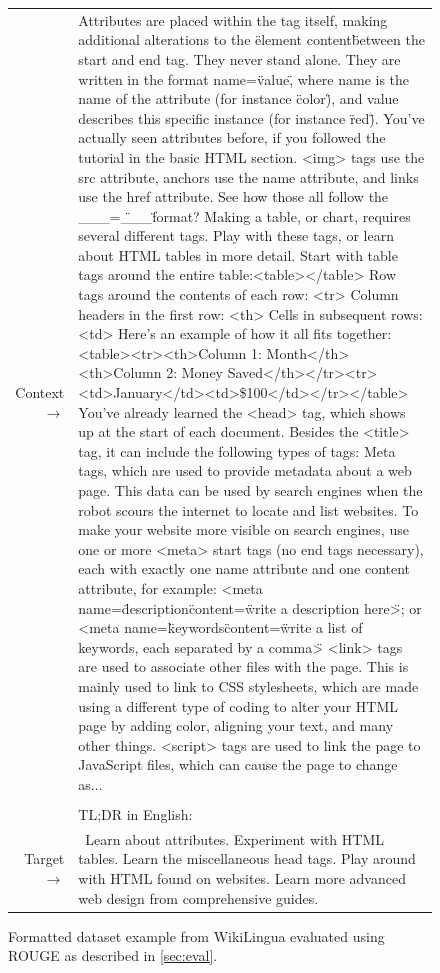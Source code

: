 \documentclass{article}
\begin{document}
\begin{figure}[!h] { \tt \footnotesize \begin{tabularx}{\linewidth}{r X} \toprule Context $\to$ & Attributes are placed within the tag itself, making additional alterations to the \"element content\" between the start and end tag. They never stand alone. They are written in the format name=\"value\", where name is the name of the attribute (for instance \"color\"), and value describes this specific instance (for instance \"red\"). You've actually seen attributes before, if you followed the tutorial in the basic HTML section. <img> tags use the src attribute, anchors use the name attribute, and links use the href attribute. See how those all follow the \_\_\_=\"\_\_\_\" format? Making a table, or chart, requires several different tags. Play with these tags, or learn about HTML tables in more detail.  Start with table tags around the entire table:<table></table>  Row tags around the contents of each row: <tr>  Column headers in the first row: <th>  Cells in subsequent rows: <td>  Here's an example of how it all fits together:<table><tr><th>Column 1: Month</th><th>Column 2: Money Saved</th></tr><tr><td>January</td><td>\$100</td></tr></table> You've already learned the <head> tag, which shows up at the start of each document. Besides the <title> tag, it can include the following types of tags:   Meta tags, which are used to provide metadata about a web page. This data can be used by search engines when the robot scours the internet to locate and list websites. To make your website more visible on search engines, use one or more <meta> start tags (no end tags necessary), each with exactly one name attribute and one content attribute, for example: <meta name=\"description\" content=\"write a description here\">; or <meta name=\"keywords\" content=\"write a list of keywords, each separated by a comma\"> <link> tags are used to associate other files with the page. This is mainly used to link to CSS stylesheets, which are made using a different type of coding to alter your HTML page by adding color, aligning your text, and many other things. <script> tags are used to link the page to JavaScript files, which can cause the page to change as... \\
& \\
& TL;DR in English:\\
\midrule 
Target $\to$ & ~Learn about attributes. Experiment with HTML tables. Learn the miscellaneous head tags. Play around with HTML found on websites. Learn more advanced web design from comprehensive guides.\\
\bottomrule \end{tabularx} }
\caption{Formatted dataset example from WikiLingua evaluated using ROUGE as described in \autoref{sec:eval}.}  
\label{eval:wikilingua}  
\end{figure}
\end{document}
